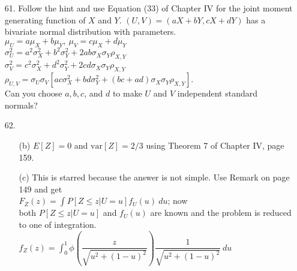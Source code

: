 \begin{enumerate}
	\item[61.] Follow the hint and use Equation (33) of Chapter IV for the joint moment generating function of $X$ and $Y$. $(U,V) = (aX + bY, cX +dY)$ has a bivariate normal distribution with parameters. \\
	$\mu_U = a\mu_X + b\mu_Y,\ \mu_V = c\mu_X + d\mu_Y$ \\
	$\sigma^2_U = a^2\sigma^2_X + b^2\sigma^2_Y + 2ab\sigma_X\sigma_Y\rho_{X,Y}$ \\
	$\sigma^2_V = c^2\sigma^2_X + d^2\sigma^2_Y + 2cd\sigma_X\sigma_Y\rho_{X,Y}$ \\
	$\rho_{U,V} = \sigma_U\sigma_V[ac\sigma^2_X + bd\sigma^2_Y + (bc+ad)\sigma_X\sigma_Y\rho_{X,Y}]$. \\
	Can you choose $a, b, c$, and $d$ to make $U$ and $V$ independent standard normals?
	
	\item[62.] \begin{itemize}
		\item[(b)] $E[Z]=0$ and $\mbox{var}[Z]=2/3$ using Theorem 7 of Chapter IV, page 159.
		\item[(c)] This is starred because the answer is not simple. Use Remark on page 149 and get \\
		$\displaystyle F_Z(z) = \int P[Z\le z\vert U=u]f_U(u)\ du$; now \\
		both $P[Z\le z\vert U=u]$ and $f_U(u)$ are known and the problem is reduced to one of integration. \\
		$\displaystyle f_Z(z) = \int_{0}^{1}\phi\left(\dfrac{z}{\sqrt{u^2+(1-u)^2}}\right) \dfrac{1}{\sqrt{u^2+(1-u)^2}}\ du$
	\end{itemize}
	
	\newpage
	
\end{enumerate}